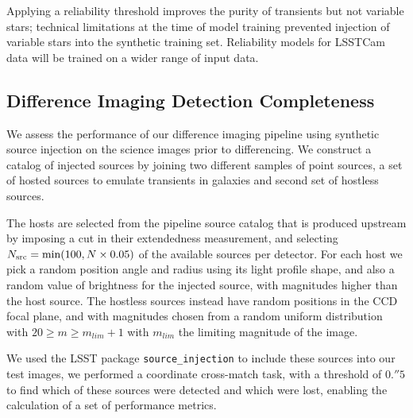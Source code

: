 Applying a reliability threshold improves the purity of transients but not variable stars; technical limitations at the time of model training prevented injection of variable stars into the synthetic training set.
Reliability models for \gls{LSSTCam} data will be trained on a wider range of input data.

\subsection{Difference Imaging Detection Completeness} \label{sec:perf:dia_completeness}

We assess the performance of our difference imaging \gls{pipeline} using synthetic source injection on the science images prior to differencing.
We construct a catalog of injected sources by joining two different samples of point sources, a set of hosted sources to emulate transients in galaxies and second set of hostless sources.

The hosts are selected from the \gls{pipeline} source catalog that is produced upstream by imposing a cut in their extendedness measurement, and selecting $N_{\rm src}={\rm min}(100, N\times0.05)$ of the available sources per detector.
%
%
For each host we pick a random position angle and radius using its light profile \gls{shape}, and also a random value of brightness for the injected source, with magnitudes higher than the host source.
The hostless sources instead have random positions in the \gls{CCD} focal plane, and with magnitudes chosen from a random uniform distribution with $20 \geq m \geq m_{lim} + 1$  with $m_{lim}$ the limiting magnitude of the image.

We used the \gls{LSST} package \texttt{source\_injection} to include these sources into our test images, we performed a coordinate cross-match task, with a threshold of $0.''5$ to find which of these sources were detected and which were lost, enabling the calculation of a set of performance metrics.

